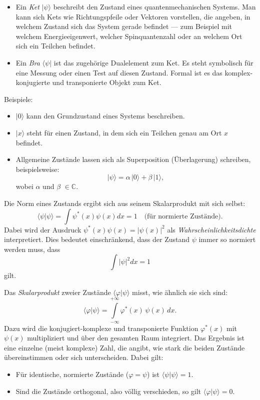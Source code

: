 		\begin{itemize}
			\item Ein \emph{Ket} $|\psi\rangle$ beschreibt den Zustand eines quantenmechanischen Systems.
			Man kann sich Kets wie Richtungspfeile oder Vektoren vorstellen, die angeben, in welchem Zustand sich das System gerade befindet ---
			zum Beispiel mit welchem Energieeigenwert, welcher Spinquantenzahl oder an welchem Ort sich ein Teilchen befindet.
			\item Ein \emph{Bra} $\langle\psi|$ ist das zugehörige Dualelement zum Ket.
			Es steht symbolisch für eine Messung oder einen Test auf diesen Zustand.
			Formal ist es das komplex-konjugierte und transponierte Objekt zum Ket.
		\end{itemize}
		
		Beispiele:
		\begin{itemize}
		\item $|0\rangle$ kann den Grundzustand eines Systems beschreiben.
		\item $|x\rangle$ steht für einen Zustand, in dem sich ein Teilchen genau am Ort $x$ befindet.
		\item Allgemeine Zustände lassen sich als Superposition (Überlagerung) schreiben, beispielsweise:
		\[
			|\psi\rangle = \alpha\,|0\rangle + \beta\,|1\rangle,
		\]
		wobei $\alpha$ und $\beta$ $\in \mathbb{C}$.
		\end{itemize}

		Die Norm eines Zustands ergibt sich aus seinem Skalarprodukt mit sich selbst:
		\begin{equation}\label{fourier:equation:normEinesZustands}
			\langle \psi | \psi \rangle = \int \psi^*(x)\psi(x)dx = 1 \quad \text{(für normierte Zustände)}.
		\end{equation}
		Dabei wird der Ausdruck $\psi^*(x)\psi(x) = |\psi(x)|^2$ als \emph{Wahrscheinlichkeitsdichte} interpretiert.
		Dies bedeutet einschränkend, dass der Zustand $\psi$ immer so normiert werden muss, dass
		\begin{equation}
			\int |\psi|^2 dx = 1
		\end{equation}
		gilt.

		Das \emph{Skalarprodukt} zweier Zustände $\langle \varphi | \psi \rangle$ misst, wie ähnlich sie sich sind:
		\begin{equation}
		\langle \varphi | \psi \rangle = \int\limits_{-\infty}^{+\infty} \varphi^*(x)\,\psi(x)\,dx.
		\end{equation}
		Dazu wird die konjugiert-komplexe und transponierte Funktion $\varphi^*(x)$ mit $\psi(x)$ multipliziert und über den gesamten Raum integriert.
		Das Ergebnis ist eine einzelne (meist komplexe) Zahl, die angibt, wie stark die beiden Zustände übereinstimmen oder sich unterscheiden. 
		Dabei gilt:
		\begin{itemize}
			\item Für identische, normierte Zustände ($\varphi = \psi$) ist $\langle \psi | \psi \rangle = 1$.
			\item Sind die Zustände orthogonal, also völlig verschieden, so gilt $\langle \varphi | \psi \rangle  = 0$.
		\end{itemize}
	

